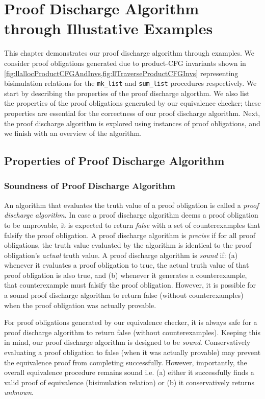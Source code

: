 \chapter{Proof Discharge Algorithm through Illustative Examples}
\label{sec:examples}
This chapter demonstrates our proof discharge algorithm through examples.
We consider proof obligations generated due to product-CFG invariants shown in \cref{fig:llallocProductCFGAndInvs,fig:llTraverseProductCFGInvs}
representing bisimulation relations for the {\tt mk\_list} and {\tt sum\_list} procedures respectively.
We start by describing the properties of the proof discharge algorthm.
We also list the properties of the proof obligations generated by our equivalence checker;
these properties are essential for the correctness of our proof discharge algorithm.
Next, the proof discharge algorithm is explored using instances of proof obligations,
and we finish with an overview of the algorithm.

\section{Properties of Proof Discharge Algorithm}
\label{sec:proofalgoprops}
\vspace{-10px}
\subsection{Soundness of Proof Discharge Algorithm}
\label{sec:proofalgosound}
An algorithm that evaluates the truth value of a proof obligation is called a
{\em proof discharge algorithm}.
In case a proof discharge algorithm deems a proof obligation to be unprovable,
it is expected to return {\em false} with a set of counterexamples that falsify
the proof obligation.
A proof discharge algorithm is {\em precise} if for all proof obligations,
the truth value evaluated by the algorithm is identical to the proof obligation's
{\em actual} truth value.
A proof discharge algorithm is {\em sound} if:
(a) whenever it evaluates a proof obligation to true,
the actual truth value of that proof obligation is also true,
and (b) whenever it generates a counterexample, that counterexample
must falsify the proof obligation.
However, it is possible for a sound proof discharge algorithm to return false
(without counterexamples) when the proof obligation was actually provable.

For proof obligations generated by our equivalence checker,
it is always safe for a proof discharge algorithm to return false (without counterexamples).
Keeping this in mind, our proof discharge algorithm is designed to be {\em sound}.
Conservatively evaluating a proof obligation to false (when it was actually provable)
may prevent the equivalence proof from completing successfully.
However, importantly, the overall equivalence procedure remains sound i.e.
(a) either it successfully finds a valid proof of equivalence (bisimulation relation)
or (b) it conservatively returns {\em unknown}.

